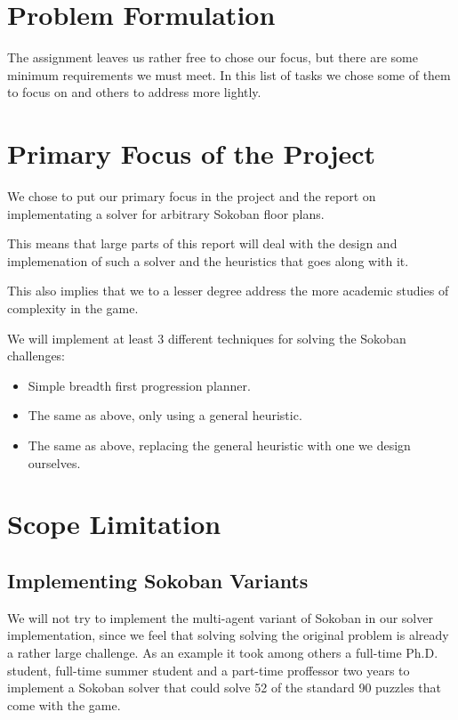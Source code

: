 \section{Problem Formulation}

The assignment leaves us rather free to chose our focus, but there are
some minimum requirements we must meet. In this list of tasks we chose
some of them to focus on and others to address more lightly.

\section{Primary Focus of the Project}
We chose to put our primary focus in the project and the report on
implementating a solver for arbitrary Sokoban floor plans.

This means that large parts of this report will deal with the design
and implemenation of such a solver and the heuristics that goes along
with it.

This also implies that we to a lesser degree address the more academic
studies of complexity in the game.

We will implement at least 3 different techniques for solving the
Sokoban challenges:
\begin{itemize}
\item Simple breadth first progression planner. %
\item The same as above, only using a general heuristic. %
\item The same as above, replacing the general heuristic with one we
  design ourselves.
\end{itemize}



\section{Scope Limitation}
\label{sec:scope}
\subsection{Implementing Sokoban Variants}
We will not try to implement the multi-agent variant of Sokoban in our
solver implementation, since we feel that solving solving the original
problem is already a rather large challenge. As an example it took
among others a full-time Ph.D. student, full-time summer student and a
part-time proffessor two years to implement a Sokoban solver that
could solve 52 of the standard 90 puzzles that come with the
game. \citep{Junghanns99domain-dependentsingle-agent}

